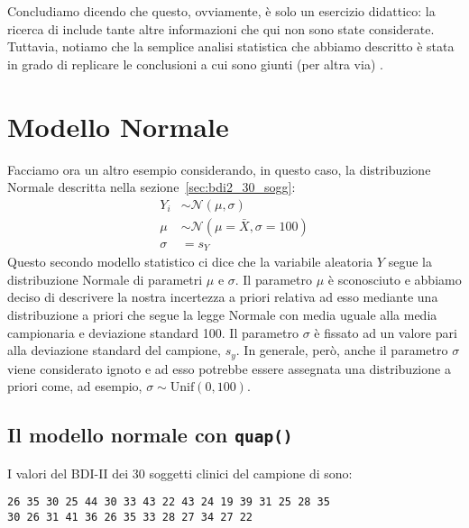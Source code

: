Concludiamo dicendo che questo, ovviamente, è solo un esercizio didattico: la ricerca di \citet{Gautret_2020} include tante altre informazioni che qui non sono state considerate.
Tuttavia, notiamo che la semplice analisi statistica che abbiamo descritto è stata in grado di replicare le conclusioni a cui sono giunti (per altra via) \citet{Hulme_2020}.


\section{Modello Normale}

Facciamo ora un altro esempio considerando, in questo caso, la distribuzione Normale descritta nella sezione~\ref{sec:bdi2_30_sogg}:
\begin{align}
Y_i &\sim \mathcal{N}(\mu, \sigma) \tag*{[verosimiglianza]}\\
\mu &\sim \mathcal{N}(\mu = \bar{X}, \sigma = 100) \tag*{[distr. a priori per $\mu$]}\\
\sigma &= s_Y \tag*{[parametro assunto noto]}
\end{align}
Questo secondo modello statistico ci dice che la variabile aleatoria $Y$ segue la distribuzione Normale di parametri $\mu$ e $\sigma$. 
Il parametro $\mu$ è sconosciuto e abbiamo deciso di descrivere la nostra incertezza a priori relativa ad esso mediante una distribuzione a priori che segue la legge Normale con media uguale alla media campionaria e deviazione standard 100.
Il parametro $\sigma$ è fissato ad un valore pari alla deviazione standard del campione, $s_y$.
In generale, però, anche il parametro $\sigma$ viene considerato ignoto e ad esso potrebbe essere assegnata una distribuzione a priori come, ad esempio, $\sigma \sim \text{Unif}(0, 100)$.


\subsection{Il modello normale con \texttt{quap()}}

I valori del BDI-II dei 30 soggetti clinici del campione di \citet{zetsche_future_2019} sono:



\begin{lstlisting}
26 35 30 25 44 30 33 43 22 43 24 19 39 31 25 28 35 
30 26 31 41 36 26 35 33 28 27 34 27 22
\end{lstlisting}
 



